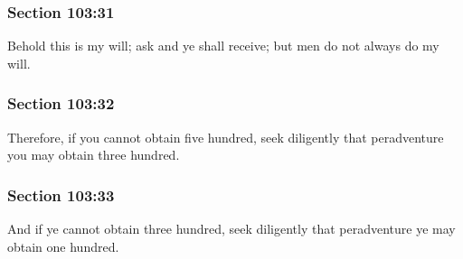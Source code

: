 	\subsubsection{Section 103:31} %
		\label{DC103-31}

		Behold this is my will; ask and ye shall receive; but men do not always do my will.


	\subsubsection{Section 103:32} %
		\label{DC103-32}

		Therefore, if you cannot obtain five hundred, seek diligently that peradventure you may obtain three hundred.


	\subsubsection{Section 103:33} %
		\label{DC103-33}

		And if ye cannot obtain three hundred, seek diligently that peradventure ye may obtain one hundred.


